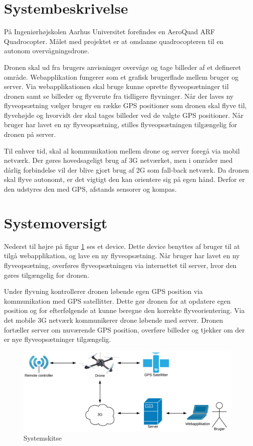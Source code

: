 \section{Systembeskrivelse}
På Ingeniørhøjskolen Aarhus Universitet forefindes en AeroQuad ARF Quadrocopter. 
Målet med projektet er at omdanne quadrocopteren til en autonom overvågningsdrone.

Dronen skal ud fra brugers anvisninger overvåge og tage billeder af et defineret område. Webapplikation fungerer som et grafisk brugerflade mellem bruger og server.  
Via webapplikationen skal bruge kunne oprette flyveopsætninger til dronen samt se billeder og flyverute fra tidligere flyvninger. 
Når der laves ny flyveopsætning vælger bruger en række GPS positioner som dronen skal flyve til, flyvehøjde og hvorvidt der skal tages billeder ved de valgte GPS positioner. Når bruger har lavet en ny flyveopsætning, stilles flyveopsætningen tilgængelig for dronen på server.  

Til enhver tid, skal al kommunikation mellem drone og server foregå via mobil netværk. Der gøres hovedsageligt brug af 3G netværket, men i områder med dårlig forbindelse vil der blive gjort brug af 2G som fall-back netværk. Da dronen skal flyve autonomt, er det vigtigt den kan orientere sig på egen hånd. Derfor er den udstyres den med GPS, afstands sensorer og kompas.



\section{Systemoversigt}
Nederst til højre på figur \ref{fig:Systemskitse} ses et device. Dette device benyttes af bruger til at tilgå webapplikation, og lave en ny flyveopsætning. Når bruger har lavet en ny flyveopsætning, overføres flyveopsætningen via internettet til server, hvor den gøres tilgængelig for dronen.
 
Under flyvning kontrollerer dronen løbende egen GPS position via kommunikation med GPS satellitter. Dette gør dronen for at opdatere egen position og for efterfølgende at kunne beregne den korrekte flyveorientering. 
Via det mobile 3G netværk kommunikerer drone løbende med server. Dronen fortæller server om nuværende GPS position, overføre billeder og tjekker om der er nye flyveopsætninger tilgængelig. 

\vspace{-5pt}
\begin{figure}[H]
\centering
\includegraphics[width=1\textwidth]{Billeder/Projektbeskrivelse.png}
\vspace{-.5cm}
\caption{Systemskitse}
\label{fig:Systemskitse}
\end{figure}